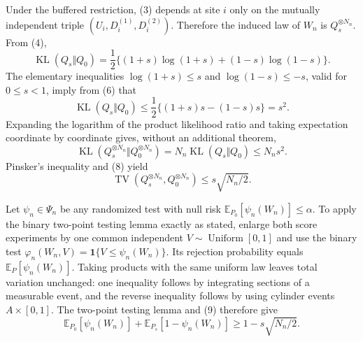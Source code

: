 Under the buffered restriction, (3) depends at site \(i\) only on the mutually independent triple \((U_i,D_i^{(1)},D_i^{(2)})\).  Therefore the induced law of \(W_n\) is \(Q_s^{\otimes N_n}\).  From (4),
\[
 \operatorname{KL}(Q_s\Vert Q_0)
 =\frac12\{(1+s)\log(1+s)+(1-s)\log(1-s)\}. \tag{6}
\]
The elementary inequalities \(\log(1+s)\le s\) and \(\log(1-s)\le-s\), valid for \(0\le s<1\), imply from (6) that
\[
 \operatorname{KL}(Q_s\Vert Q_0)
 \le\frac12\{(1+s)s-(1-s)s\}=s^2. \tag{7}
\]
Expanding the logarithm of the product likelihood ratio and taking expectation coordinate by coordinate gives, without an additional theorem,
\[
 \operatorname{KL}(Q_s^{\otimes N_n}\Vert Q_0^{\otimes N_n})
 =N_n\operatorname{KL}(Q_s\Vert Q_0)\le N_ns^2. \tag{8}
\]
Pinsker's inequality and (8) yield
\[
 \operatorname{TV}(Q_s^{\otimes N_n},Q_0^{\otimes N_n})
 \le s\sqrt{N_n/2}. \tag{9}
\]

Let \(\psi_n\in\Psi_n\) be any randomized test with null risk
\(\mathbb E_{P_0}[\psi_n(W_n)]\le\alpha\).  To apply the binary two-point testing lemma exactly as stated, enlarge both score experiments by one common independent \(V\sim\operatorname{Uniform}[0,1]\) and use the binary test
\(\varphi_n(W_n,V)=\mathbf 1\{V\le\psi_n(W_n)\}\).  Its rejection probability equals \(\mathbb E_P[\psi_n(W_n)]\).  Taking products with the same uniform law leaves total variation unchanged: one inequality follows by integrating sections of a measurable event, and the reverse inequality follows by using cylinder events \(A\times[0,1]\).  The two-point testing lemma and (9) therefore give
\[
 \mathbb E_{P_0}[\psi_n(W_n)]
 +\mathbb E_{P_s}[1-\psi_n(W_n)]
 \ge1-s\sqrt{N_n/2}. \tag{10}
\]

